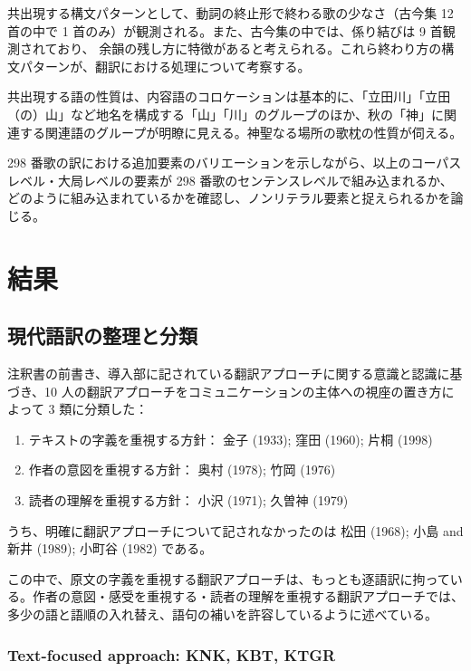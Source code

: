 \documentclass[
  letterpaper,
  DIV=11,
  numbers=noendperiod]{scrartcl}
\providecommand{\tightlist}{%
  \setlength{\itemsep}{0pt}\setlength{\parskip}{0pt}}\usepackage{longtable,booktabs,array}
\begin{document}
共出現する構文パターンとして、動詞の終止形で終わる歌の少なさ（古今集 12
首の中で 1 首のみ）が観測される。また、古今集の中では、係り結びは 9
首観測されており、
余韻の残し方に特徴があると考えられる。これら終わり方の構文パターンが、翻訳における処理について考察する。

共出現する語の性質は、内容語のコロケーションは基本的に、「立田川」「立田（の）山」など地名を構成する「山」「川」のグループのほか、秋の「神」に関連する関連語のグループが明瞭に見える。神聖なる場所の歌枕の性質が伺える。

298
番歌の訳における追加要素のバリエーションを示しながら、以上のコーパスレベル・大局レベルの要素が
298
番歌のセンテンスレベルで組み込まれるか、どのように組み込まれているかを確認し、ノンリテラル要素と捉えられるかを論じる。

\section{結果}\label{sec-results}

\subsection{現代語訳の整理と分類}\label{ux73feux4ee3ux8a9eux8a33ux306eux6574ux7406ux3068ux5206ux985e}

注釈書の前書き、導入部に記されている翻訳アプローチに関する意識と認識に基づき、10
人の翻訳アプローチをコミュニケーションの主体への視座の置き方によって 3
類に分類した：

\begin{enumerate}
\def\labelenumi{\arabic{enumi}.}
\tightlist
\item
  テキストの字義を重視する方針： 金子 (1933); 窪田 (1960); 片桐 (1998)
\item
  作者の意図を重視する方針： 奥村 (1978); 竹岡 (1976)
\item
  読者の理解を重視する方針： 小沢 (1971); 久曽神 (1979)
\end{enumerate}

うち、明確に翻訳アプローチについて記されなかったのは 松田 (1968); 小島
and 新井 (1989); 小町谷 (1982) である。

この中で、原文の字義を重視する翻訳アプローチは、もっとも逐語訳に拘っている。作者の意図・感受を重視する・読者の理解を重視する翻訳アプローチでは、多少の語と語順の入れ替え、語句の補いを許容しているように述べている。

\subsubsection*{Text-focused approach: KNK, KBT,
KTGR}\label{text-focused-approach-knk-kbt-ktgr}
\end{document}
